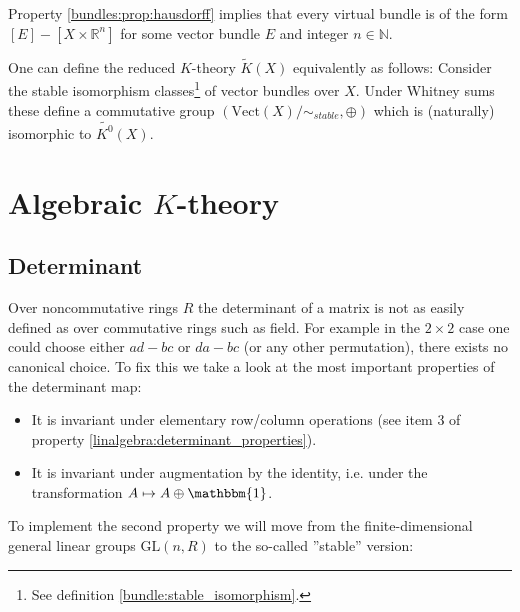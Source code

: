     \begin{property}
        Property \ref{bundles:prop:hausdorff} implies that every virtual bundle is of the form $[E]-[X\times\mathbb{R}^n]$ for some vector bundle $E$ and integer $n\in\mathbb{N}$.
    \end{property}


    \begin{adefinition}
        One can define the reduced $K$-theory $\widetilde{K}(X)$ equivalently as follows: Consider the stable isomorphism classes\footnote{See definition \ref{bundle:stable_isomorphism}.} of vector bundles over $X$. Under Whitney sums these define a commutative group $(\text{Vect}(X)/\sim_{stable}, \oplus)$ which is (naturally) isomorphic to $\widetilde{K^0}(X)$.
    \end{adefinition}

\section{Algebraic $K$-theory}
\subsection{Determinant}

    Over noncommutative rings $R$ the determinant of a matrix is not as easily defined as over commutative rings such as field. For example in the $2\times2$ case one could choose either $ad-bc$ or $da-bc$ (or any other permutation), there exists no canonical choice. To fix this we take a look at the most important properties of the determinant map:
    \begin{itemize}
        \item It is invariant under elementary row/column operations (see item 3 of property \ref{linalgebra:determinant_properties}).
        \item It is invariant under augmentation by the identity, i.e. under the transformation $A\mapsto A\oplus\mathbbm{1}$.
    \end{itemize}
    To implement the second property we will move from the finite-dimensional general linear groups $\text{GL}(n, R)$ to the so-called ''stable'' version:

